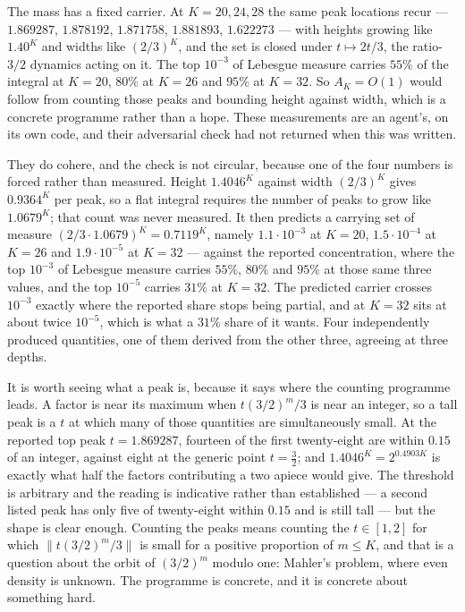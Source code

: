 \documentclass[11pt]{article}
\theoremstyle{remark}
\begin{document}
The mass has a fixed carrier. At $K=20,24,28$ the same peak locations recur --- $1.869287$, $1.878192$,
$1.871758$, $1.881893$, $1.622273$ --- with heights growing like $1.40^K$ and widths like $(2/3)^K$,
and the set is closed under $t\mapsto2t/3$, the ratio-$3/2$ dynamics acting on it. The top $10^{-3}$ of
Lebesgue measure carries $55\%$ of the integral at $K=20$, $80\%$ at $K=26$ and $95\%$ at $K=32$. So
$A_K=O(1)$ would follow from counting those peaks and bounding height against width, which is a concrete
programme rather than a hope. These measurements are an agent's, on its own code, and their adversarial
check had not returned when this was written.

They do cohere, and the check is not circular, because one of the four numbers is forced rather than
measured. Height $1.4046^K$ against width $(2/3)^K$ gives $0.9364^K$ per peak, so a flat integral
requires the number of peaks to grow like $1.0679^K$; that count was never measured. It then predicts a
carrying set of measure $(2/3\cdot1.0679)^K=0.7119^K$, namely $1.1\cdot10^{-3}$ at $K=20$,
$1.5\cdot10^{-4}$ at $K=26$ and $1.9\cdot10^{-5}$ at $K=32$ --- against the reported concentration, where
the top $10^{-3}$ of Lebesgue measure carries $55\%$, $80\%$ and $95\%$ at those same three values, and
the top $10^{-5}$ carries $31\%$ at $K=32$. The predicted carrier crosses $10^{-3}$ exactly where the
reported share stops being partial, and at $K=32$ sits at about twice $10^{-5}$, which is what a $31\%$
share of it wants. Four independently produced quantities, one of them derived from the other three,
agreeing at three depths.

It is worth seeing what a peak is, because it says where the counting programme leads. A factor is near
its maximum when $t(3/2)^m/3$ is near an integer, so a tall peak is a $t$ at which many of those
quantities are simultaneously small. At the reported top peak $t=1.869287$, fourteen of the first
twenty-eight are within $0.15$ of an integer, against eight at the generic point $t=\tfrac32$; and
$1.4046^K=2^{0.4903K}$ is exactly what half the factors contributing a two apiece would give. The
threshold is arbitrary and the reading is indicative rather than established --- a second listed peak has
only five of twenty-eight within $0.15$ and is still tall --- but the shape is clear enough. Counting the
peaks means counting the $t\in[1,2]$ for which $\|t(3/2)^m/3\|$ is small for a positive proportion of
$m\le K$, and that is a question about the orbit of $(3/2)^m$ modulo one: Mahler's problem, where even
density is unknown. The programme is concrete, and it is concrete about something hard.
\end{document}
